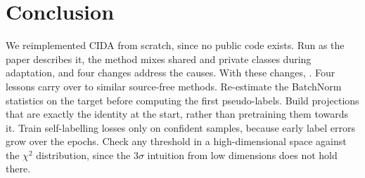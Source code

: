 \section{Conclusion}\label{sec:conclusion}
We reimplemented CIDA from scratch, since no public code exists.
Run as the paper describes it, the method mixes shared and private classes during adaptation, and four changes address the causes.
With these changes, .
Four lessons carry over to similar source-free methods.
Re-estimate the BatchNorm statistics on the target before computing the first pseudo-labels.
Build projections that are exactly the identity at the start, rather than pretraining them towards it.
Train self-labelling losses only on confident samples, because early label errors grow over the epochs.
Check any threshold in a high-dimensional space against the $\chi^2$ distribution, since the $3\sigma$ intuition from low dimensions does not hold there.
